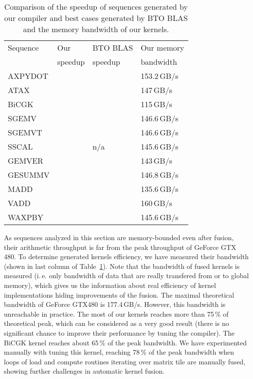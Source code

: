 \documentclass[final]{siamltex}
\def\ie{i.\,e.}
\begin{document}
{\begin{table}
        \centering
        \small
        \begin{tabular}{|l|l|l|l|}
                \hline
                Sequence & Our     & BTO BLAS & Our memory\\
                         & speedup & speedup  & bandwidth\\
                \hline
                AXPYDOT &  &  & 153.2\,GB/s\\
                ATAX &  &  & 147\,GB/s\\
                BiCGK &  &  & 115\,GB/s\\
                SGEMV &  &  & 146.6\,GB/s\\
                SGEMVT &  &  & 146.6\,GB/s\\
                SSCAL &  & n/a & 145.6\,GB/s\\
                GEMVER &  &  & 143\,GB/s\\
                GESUMMV &  &  & 146.8\,GB/s\\
                MADD &  &  & 135.6\,GB/s\\
                VADD &  &  & 160\,GB/s\\
                WAXPBY &  &  & 145.6\,GB/s\\
                \hline
        \end{tabular}
        \caption{Comparison of the speedup of sequences generated by our compiler and best cases generated by BTO BLAS and the memory bandwidth of our kernels.}
        \label{tab:fublas_comp}
\end{table}

As sequences analyzed in this section are memory-bounded even after fusion, their arithmetic throughput is far from the peak throughput of GeForce GTX 480. To determine generated kernels efficiency, we have measured their bandwidth (shown in last column of Table~\ref{tab:fublas_comp}). Note that the bandwidth of fused kernels is measured (\ie{} only bandwidth of data that are really transfered from or to global memory), which gives us the information about real efficiency of kernel implementations hiding improvements of the fusion. The maximal theoretical bandwidth of GeForce GTX480 is 177.4\,GB/s. However, this bandwidth is unreachable in practice. The most of our kernels reaches more than 75\,\% of theoretical peak, which can be considered as a very good result (there is no significant chance to improve their performance by tuning the compiler). The BiCGK kernel reaches about 65\,\% of the peak bandwidth. We have experimented manually with tuning this kernel, reaching 78\,\% of the peak bandwidth when loops of load and compute routines iterating over matrix tile are manually fused, showing further challenges in automatic kernel fusion.

}
\end{document}
